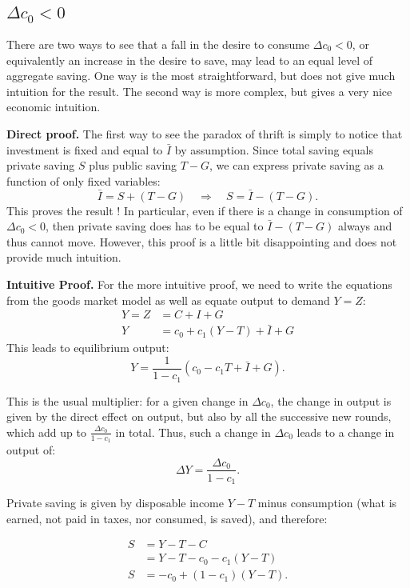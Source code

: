 \documentclass[]{book}
\theoremstyle{definition}
\theoremstyle{definition}
\theoremstyle{definition}
\theoremstyle{remark}
\begin{document}
\subsection{\texorpdfstring{\(\Delta c_{0}<0\)}{\textbackslash{}Delta c\_\{0\}\textless{}0}}\label{delta-c_00}

There are two ways to see that a fall in the desire to consume
\(\Delta c_0 <0\), or equivalently an increase in the desire to save,
may lead to an equal level of aggregate saving. One way is the most
straightforward, but does not give much intuition for the result. The
second way is more complex, but gives a very nice economic intuition.

\textbf{Direct proof.} The first way to see the paradox of thrift is
simply to notice that investment is fixed and equal to \(\bar{I}\) by
assumption. Since total saving equals private saving \(S\) plus public
saving \(T-G\), we can express private saving as a function of only
fixed variables:
\[\bar{I}=S+\left(T-G\right)\quad\Rightarrow\quad S=\bar{I}-\left(T-G\right).\]
This proves the result ! In particular, even if there is a change in
consumption of \(\Delta c_{0}<0\), then private saving does has to be
equal to \(\bar{I}-\left(T-G\right)\) always and thus cannot move.
However, this proof is a little bit disappointing and does not provide
much intuition.

\textbf{Intuitive Proof.} For the more intuitive proof, we need to write
the equations from the goods market model as well as equate output to
demand \(Y=Z\): \[\begin{aligned}
Y   =Z&=C+I+G\\
Y   &=c_{0}+c_{1}(Y-T)+\bar{I}+G
\end{aligned}\] This leads to equilibrium output:
\[Y=\frac{1}{1-c_{1}}\left(c_{0}-c_{1}T+\bar{I}+G\right).\]

This is the usual multiplier: for a given change in \(\Delta c_{0}\),
the change in output is given by the direct effect on output, but also
by all the successive new rounds, which add up to
\(\frac{\Delta c_{0}}{1-c_{1}}\) in total. Thus, such a change in
\(\Delta c_{0}\) leads to a change in output of:
\[\Delta Y=\frac{\Delta c_{0}}{1-c_{1}}.\]

Private saving is given by disposable income \(Y-T\) minus consumption
(what is earned, not paid in taxes, nor consumed, is saved), and
therefore:

\[
\begin{aligned}
S &= Y-T-C\\
&= Y-T-c_{0}-c_{1}\left(Y-T\right)\\
S   &= -c_{0}+\left(1-c_{1}\right)\left(Y-T\right).
\end{aligned}
\]
\end{document}
